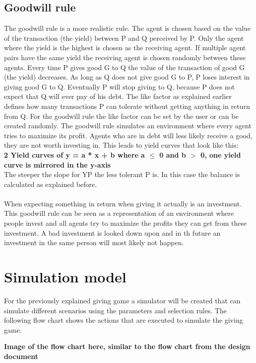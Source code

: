 \documentclass[twoside,openright]{uva-bachelor-thesis}
\begin{document}
\subsection{Goodwill rule}
The goodwill rule is a more realistic rule. The agent is chosen based on the value of the transaction (the yield) between P and Q perceived by P. Only the agent where the yield is the highest is chosen as the receiving agent. If multiple agent pairs have the same yield the receiving agent is chosen randomly between these agents. Every time P gives good G to Q the value of the transaction of good G (the yield) decreases. As long as Q does not give good G to P, P loses interest in giving good G to Q. Eventually P will stop giving to Q, because P does not expect that Q will ever pay of his debt. The like factor as explained earlier defines how many transactions P can tolerate without getting anything in return from Q. For the goodwill rule the like factor can be set by the user or can be created randomly. The goodwill rule simulates an environment where every agent tries to maximize its profit. Agents who are in debt will less likely receive a good, they are not worth investing in.
This leads to yield curves that look like this: \\
\textbf{2 Yield curves of y = a * x + b where a $\le$ 0 and b $>$ 0, one yield curve is mirrored in the y-axis}\\
The steeper the slope for YP the less tolerant P is. In this case the balance is calculated as explained before.
\\
\\
When expecting something in return when giving it actually is an investment. This goodwill rule can be seen as a representation of an environment where people invest and all agents try to maximize the profits they can get from these investment. A bad investment is looked down upon and in th future an investment in the same person will most likely not happen.

\section{Simulation model}
For the previously explained giving game a simulator will be created that can simulate different scenarios using the parameters and selection rules. The following flow chart shows the actions that are executed to simulate the giving game.

\textbf{Image of the flow chart here, similar to the flow chart from the design document}
\end{document}
